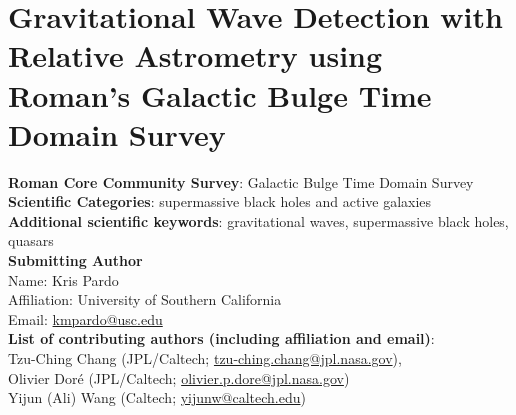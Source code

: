 \documentclass[12pt]{article}
\begin{document}

\section*{Gravitational Wave Detection with Relative Astrometry using Roman's Galactic Bulge Time Domain Survey}
\textbf{Roman Core Community Survey}: Galactic Bulge Time Domain Survey\\

\noindent \textbf{Scientific Categories}: supermassive black holes and active galaxies\\

\noindent \textbf{Additional scientific keywords}: gravitational waves, supermassive black holes, quasars\\

\noindent \textbf{Submitting Author}\\
\indent Name: Kris Pardo \\
\indent Affiliation: University of Southern California \\
\indent Email: \href{mailto:kmpardo@usc.edu}{kmpardo@usc.edu}\\

\noindent \textbf{List of contributing authors (including affiliation and email)}:\\ Tzu-Ching Chang (JPL/Caltech; \href{mailto:tzu-ching.chang@jpl.nasa.gov}{tzu-ching.chang@jpl.nasa.gov}),\\ Olivier Dor\'{e} (JPL/Caltech; \href{mailto:olivier.p.dore@jpl.nasa.gov}{olivier.p.dore@jpl.nasa.gov}) \\
Yijun (Ali) Wang (Caltech; \href{mailto:yijunw@caltech.edu}{yijunw@caltech.edu})\\
\end{document}
